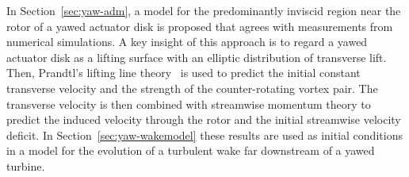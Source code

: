 In Section~\ref{sec:yaw-adm}, a model for the predominantly inviscid region near the rotor of a yawed actuator disk is proposed that agrees with measurements from numerical simulations. A key insight of this approach is to regard a yawed actuator disk as a lifting surface with an elliptic distribution of transverse lift. Then, Prandtl's lifting line theory~\cite{Milne-Thomson1973a} is used to predict the initial constant transverse velocity and the strength of the counter-rotating vortex pair. The transverse velocity is then combined with streamwise momentum theory to predict the induced velocity through the rotor and the initial streamwise velocity deficit. In Section~\ref{sec:yaw-wakemodel} these results are used as initial conditions in a model for the evolution of a turbulent wake far downstream of a yawed turbine.

